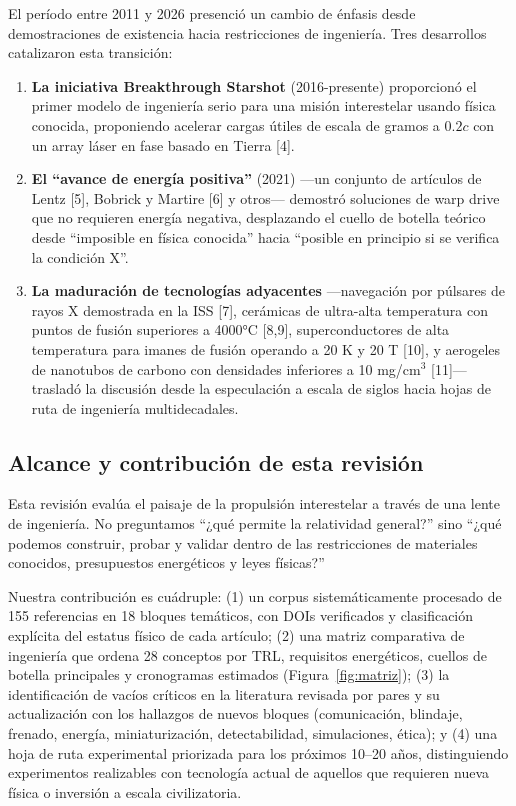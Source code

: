 \documentclass[11pt,a4paper,onecolumn]{article}
\begin{document}
El período entre 2011 y 2026 presenció un cambio de énfasis desde demostraciones de existencia hacia restricciones de ingeniería. Tres desarrollos catalizaron esta transición:

\begin{enumerate}
  \item \textbf{La iniciativa Breakthrough Starshot} (2016-presente) proporcionó el primer modelo de ingeniería serio para una misión interestelar usando física conocida, proponiendo acelerar cargas útiles de escala de gramos a $0.2c$ con un array láser en fase basado en Tierra [4].
  \item \textbf{El ``avance de energía positiva''} (2021) —un conjunto de artículos de Lentz [5], Bobrick y Martire [6] y otros— demostró soluciones de warp drive que no requieren energía negativa, desplazando el cuello de botella teórico desde ``imposible en física conocida'' hacia ``posible en principio si se verifica la condición X''.
  \item \textbf{La maduración de tecnologías adyacentes} —navegación por púlsares de rayos X demostrada en la ISS [7], cerámicas de ultra-alta temperatura con puntos de fusión superiores a 4000°C [8,9], superconductores de alta temperatura para imanes de fusión operando a 20 K y 20 T [10], y aerogeles de nanotubos de carbono con densidades inferiores a 10 mg/cm$^3$ [11]— trasladó la discusión desde la especulación a escala de siglos hacia hojas de ruta de ingeniería multidecadales.
\end{enumerate}

\subsection{Alcance y contribución de esta revisión}

Esta revisión evalúa el paisaje de la propulsión interestelar a través de una lente de ingeniería. No preguntamos ``¿qué permite la relatividad general?'' sino ``¿qué podemos construir, probar y validar dentro de las restricciones de materiales conocidos, presupuestos energéticos y leyes físicas?''

Nuestra contribución es cuádruple: (1) un corpus sistemáticamente procesado de 155 referencias en 18 bloques temáticos, con DOIs verificados y clasificación explícita del estatus físico de cada artículo; (2) una matriz comparativa de ingeniería que ordena 28 conceptos por TRL, requisitos energéticos, cuellos de botella principales y cronogramas estimados (Figura~\ref{fig:matriz}); (3) la identificación de vacíos críticos en la literatura revisada por pares y su actualización con los hallazgos de nuevos bloques (comunicación, blindaje, frenado, energía, miniaturización, detectabilidad, simulaciones, ética); y (4) una hoja de ruta experimental priorizada para los próximos 10--20 años, distinguiendo experimentos realizables con tecnología actual de aquellos que requieren nueva física o inversión a escala civilizatoria.
\end{document}
